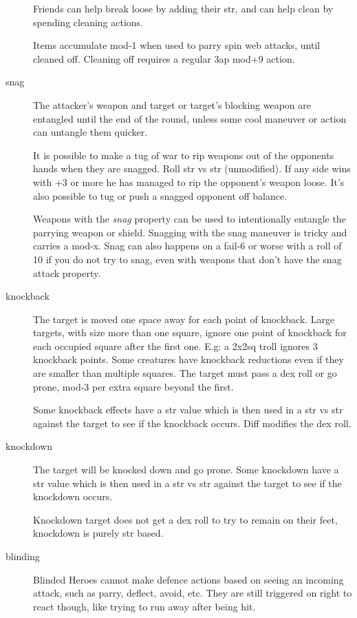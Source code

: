 \begin{description}
Friends can help break loose by adding their str, and can help clean by spending cleaning actions.

Items accumulate mod-1 when used to parry spin web attacks, until cleaned off. Cleaning off requires a regular 3ap mod+9 action.


\item[snag]
The attacker's weapon and target or target's blocking weapon are entangled until the end of the round, unless some cool maneuver or action can untangle them quicker.

It is possible to make a tug of war to rip weapons out of the opponents hands when they are snagged. Roll str vs str (unmodified). If any side wins with +3 or more he has managed to rip the opponent's weapon loose. It's also possible to tug or push a snagged opponent off balance.

Weapons with the \emph{snag} property can be used to intentionally entangle the parrying weapon or shield. Snagging with the snag maneuver is tricky and carries a mod-x. Snag can also happens on a fail-6 or worse with a roll of 10 if you do not try to snag, even with weapons that don't have the snag attack property.


\item[knockback] %
The target is moved one space away for each point of knockback.
Large targets, with size more than one square, ignore one point of knockback for each occupied square after the first one. E.g: a 2x2sq troll ignores 3 knockback points.
Some creatures have knockback reductions even if they are smaller than multiple squares.
The target must pass a dex roll or go prone, mod-3 per extra square beyond the first.

Some knockback effects have a str value which is then used in a str vs str against the target to see if the knockback occurs. Diff modifies the dex roll.


\item[knockdown] %
The target will be knocked down and go prone. Some knockdown have a str value which is then used in a str vs str against the target to see if the knockdown occurs.

Knockdown target does not get a dex roll to try to remain on their feet, knockdown is purely str based.


\item[blinding]
Blinded Heroes cannot make defence actions based on seeing an incoming attack, such as parry, deflect, avoid, etc.
They are still triggered on right to react though, like trying to run away after being hit.


\end{description}
